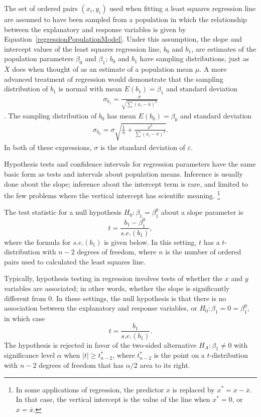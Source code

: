 The set of ordered pairs $(x_i,y_i)$ used when fitting a least squares regression line are assumed to have been sampled from a population in which the relationship between the explanatory and response variables is given by Equation~\ref{regressionPopulationModel}. Under this assumption, the slope and intercept values of the least squares regression line, $b_0$ and $b_1$, are estimates of the population parameters $\beta_0$ and $\beta_1$; $b_0$ and $b_1$ have sampling distributions, just as $\overline{X}$ does when thought of as an estimate of a population mean $\mu$. A more advanced treatment of regression would demonstrate that the sampling distribution of $b_1$ is normal with mean $E(b_1) = \beta_1$ and standard deviation
\begin{align*}
  \sigma_{b_1} = \frac{\sigma}{\sqrt{\sum(x_i -\overline{x})^2}}
\end{align*}. 
The sampling distribution of $b_0$ has mean $E(b_0) = \beta_0$ and standard deviation 
\begin{align*}
  \sigma_{b_0} = \sigma \sqrt{\frac{1}{n} + \frac{\overline{x}^2}{\sum(x_i - \overline{x})^2}}.
\end{align*} 
In both of these expressions, $\sigma$ is the standard deviation of $\varepsilon$.

Hypothesis tests and confidence intervals for regression parameters have the same basic form as tests and intervals about population means. Inference is usually done about the slope; inference about the intercept term is rare, and limited to the few problems where the vertical intercept has scientific meaning. \footnote{In some applications of regression, the predictor $x$ is replaced by $x^* = x - \overline{x}$.  In that case, the vertical intercept is the value of the line when $x^* = 0$, or $x = \overline{x}$.}

The test statistic for a null hypothesis $H_0: \beta_1 = \beta^0_1$ about a slope parameter is
\[t = \frac{b_1 - \beta^0_1}{s.e.(b_1)},\]
where the formula for $s.e.(b_1)$ is given below.
In this setting, $t$ has a $t$-distribution with $n - 2$ degrees of freedom, where $n$ is the number of ordered pairs used to calculated the least squares line.  

Typically, hypothesis testing in regression involves tests of whether the $x$ and $y$ variables are associated; in other words, whether the slope is significantly different from 0. In these settings, the null hypothesis is that there is no association between the explanatory and response variables, or $H_0: \beta_1 = 0 = \beta^0_1$, in which case
\[t = \frac{b_1}{s.e.(b_1)}.\]
The hypothesis is rejected in favor of the two-sided alternative $H_A: \beta_1 \neq 0$ with significance level $\alpha$ when $|t| \ge t^*_{n - 2}$, where $t^*_{n - 2}$ is the point on a $t$-distribution with $n-2$ degrees of freedom that has $\alpha/2$ area to its right.

